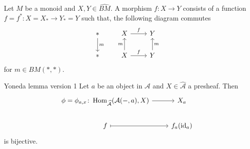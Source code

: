 \begin{exmp}
    Let $M$ be a monoid and $X,Y \in \widehat{BM}$.
    A morphism $f\colon X \to Y $ consists of a function $f=f^*\colon X =X_* \to Y_*=Y$ such that, the following diagram commutes
    \[
    \begin{tikzcd}
        *
        \arrow[d,"m"]
        &
        X
        \arrow[r,"f"]
        &
        Y
        \\
        *
        &
        X
        \arrow[u,"m"]
        \arrow[r,"f"]
        &
        Y
        \arrow[u,"m"']
    \end{tikzcd}
    \]
    for $m\in BM(*,*)$.
\end{exmp}

\begin{thm}{Yoneda lemma version 1}
\label{yoneda_lemma}
    Let $a$ be an object in $\mathcal{A}$ and $X \in \widehat{\mathcal{A}}$ a presheaf.
    Then 
    \[
    \begin{tikzcd}
       \phi = \phi_{a,x}\colon\Hom_{\widehat{\mathcal{A}}}(\mathcal{A}(-,a),X) 
       \arrow[r]
       &
       X_a 
       \\
       f 
       \arrow[r,mapsto]
       &
       f_a(\id_a)
    \end{tikzcd}
    \]
    is bijective.
\end{thm}

